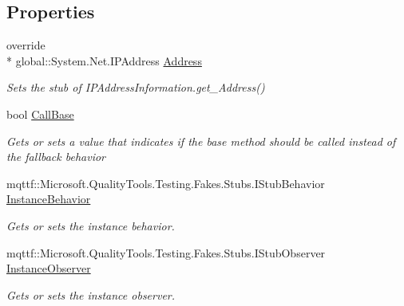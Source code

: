 \subsection*{Properties}
\begin{DoxyCompactItemize}
\item 
override \\*
global\-::\-System.\-Net.\-I\-P\-Address \hyperlink{class_system_1_1_net_1_1_network_information_1_1_fakes_1_1_stub_i_p_address_information_ab4bc8d6fd94a1bb960aaa3734c36ff66}{Address}
\begin{DoxyCompactList}\small\item\em Sets the stub of I\-P\-Address\-Information.\-get\-\_\-\-Address()\end{DoxyCompactList}\item 
bool \hyperlink{class_system_1_1_net_1_1_network_information_1_1_fakes_1_1_stub_i_p_address_information_a994ea259ca8fdc3e50374e3257284039}{Call\-Base}
\begin{DoxyCompactList}\small\item\em Gets or sets a value that indicates if the base method should be called instead of the fallback behavior\end{DoxyCompactList}\item 
mqttf\-::\-Microsoft.\-Quality\-Tools.\-Testing.\-Fakes.\-Stubs.\-I\-Stub\-Behavior \hyperlink{class_system_1_1_net_1_1_network_information_1_1_fakes_1_1_stub_i_p_address_information_acb2f665461cbb3313e3f340755e47e10}{Instance\-Behavior}
\begin{DoxyCompactList}\small\item\em Gets or sets the instance behavior.\end{DoxyCompactList}\item 
mqttf\-::\-Microsoft.\-Quality\-Tools.\-Testing.\-Fakes.\-Stubs.\-I\-Stub\-Observer \hyperlink{class_system_1_1_net_1_1_network_information_1_1_fakes_1_1_stub_i_p_address_information_ad215c3f59c8d05e15ac44c9fb3717f42}{Instance\-Observer}
\begin{DoxyCompactList}\small\item\em Gets or sets the instance observer.\end{DoxyCompactList}\item 

\end{DoxyCompactItemize}
